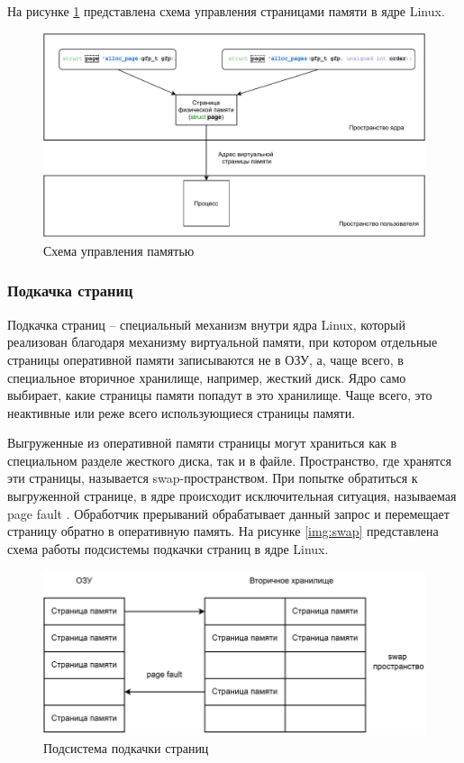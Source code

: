 На рисунке \ref{fig:memory_schema} представлена схема управления страницами памяти в ядре Linux.

\begin{figure}[h]
	\centering
	\includegraphics[width=\textwidth]{img/memory_schema.pdf}
	\caption{Схема управления памятью}
	\label{fig:memory_schema}
\end{figure}

\subsubsection{Подкачка страниц}

Подкачка страниц -- специальный механизм внутри ядра Linux, который реализован благодаря механизму виртуальной памяти, при котором отдельные страницы оперативной памяти записываются не в ОЗУ, а, чаще всего, в специальное вторичное хранилище, например, жесткий диск. Ядро само выбирает, какие страницы памяти попадут в это хранилище. Чаще всего, это неактивные или реже всего использующиеся страницы памяти. 

Выгруженные из оперативной памяти страницы могут храниться как в специальном разделе жесткого диска, так и в файле. Пространство, где хранятся эти страницы, называется swap-пространством. При попытке обратиться к выгруженной странице, в ядре происходит исключительная ситуация, называемая page fault \cite{page-fault}. Обработчик прерываний обрабатывает данный запрос и перемещает страницу обратно в оперативную память. На рисунке \ref{img:swap} представлена схема работы подсистемы подкачки страниц в ядре Linux.

\begin{figure}[h]
	\centering
	\includegraphics[width=\textwidth]{img/swap.pdf}
	\caption{Подсистема подкачки страниц}
	\label{fig:swap}
\end{figure}

